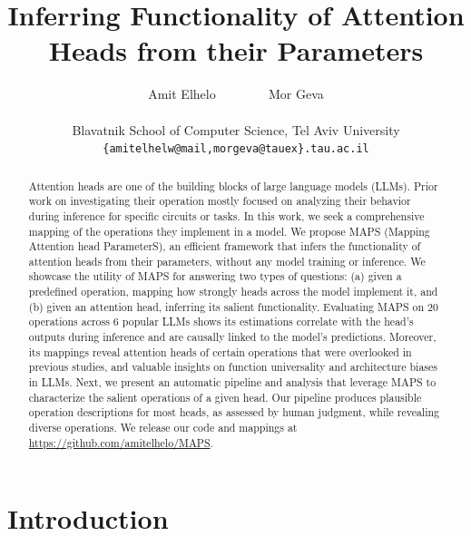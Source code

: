 \documentclass[11pt]{article}
\title{Inferring Functionality of Attention Heads from their Parameters}
\author{Amit Elhelo ~~~~~~~
Mor Geva \\
\mbox{}\\
Blavatnik School of Computer Science, Tel Aviv University \\
\small{\texttt{\{amitelhelw@mail,morgeva@tauex\}.tau.ac.il}}}
\newcommand{\framework}{\textsc{MAPS}}
\begin{document}
\maketitle


\begin{abstract}
Attention heads are one of the building blocks of large language models (LLMs). Prior work on investigating their operation mostly focused on analyzing their behavior during inference for specific circuits or tasks. In this work, we seek a comprehensive mapping of the operations they implement in a model. We propose \framework{} (Mapping Attention head ParameterS), an efficient framework that infers the functionality of attention heads from their parameters, without any model training or inference.
We showcase the utility of \framework{} for answering two types of questions: (a) given a predefined operation, mapping how strongly heads across the model implement it, and (b) given an attention head, inferring its salient functionality. Evaluating \framework{} on 20 operations across 6 popular LLMs shows its estimations correlate with the head's outputs during inference and are causally linked to the model's predictions. Moreover, its mappings reveal attention heads of certain operations that were overlooked in previous studies, and valuable insights on function universality and architecture biases in LLMs.
Next, we present an automatic pipeline and analysis that leverage \framework{} to characterize the salient operations of a given head. Our pipeline produces plausible operation descriptions for most heads, as assessed by human judgment, while revealing diverse operations. We release our code and mappings at \url{https://github.com/amitelhelo/MAPS}.

\end{abstract}



\section{Introduction}
\end{document}
